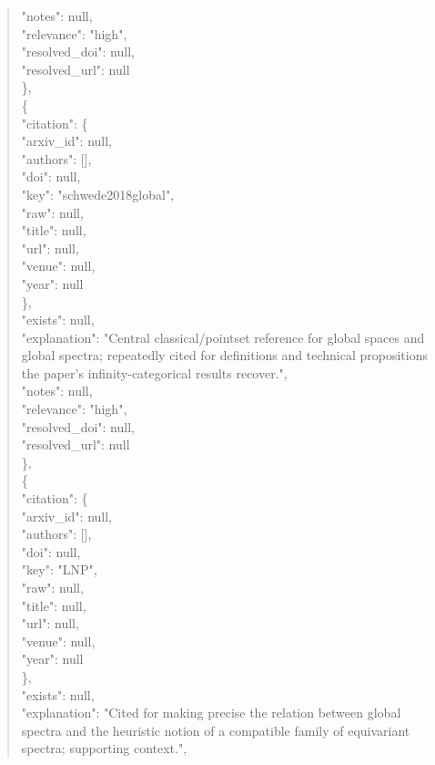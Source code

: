 \documentclass[11pt]{article}
\begin{document}
\begin{quote}
      "notes": null,\\
      "relevance": "high",\\
      "resolved\_doi": null,\\
      "resolved\_url": null\\
    \},\\
    \{\\
      "citation": \{\\
        "arxiv\_id": null,\\
        "authors": [],\\
        "doi": null,\\
        "key": "schwede2018global",\\
        "raw": null,\\
        "title": null,\\
        "url": null,\\
        "venue": null,\\
        "year": null\\
      \},\\
      "exists": null,\\
      "explanation": "Central classical/pointset reference for global spaces and global spectra; repeatedly cited for definitions and technical propositions the paper's infinity-categorical results recover.",\\
      "notes": null,\\
      "relevance": "high",\\
      "resolved\_doi": null,\\
      "resolved\_url": null\\
    \},\\
    \{\\
      "citation": \{\\
        "arxiv\_id": null,\\
        "authors": [],\\
        "doi": null,\\
        "key": "LNP",\\
        "raw": null,\\
        "title": null,\\
        "url": null,\\
        "venue": null,\\
        "year": null\\
      \},\\
      "exists": null,\\
      "explanation": "Cited for making precise the relation between global spectra and the heuristic notion of a compatible family of equivariant spectra; supporting context.",\\

\end{quote}
\end{document}

